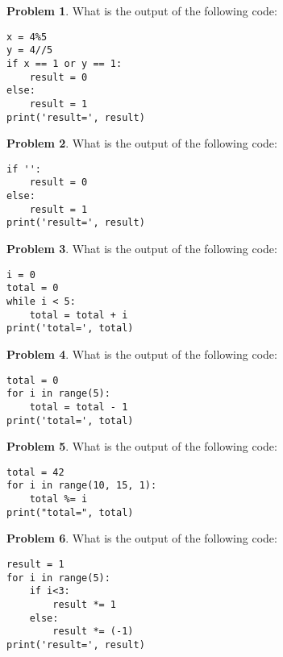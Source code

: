 \documentclass[10pt]{article}
\theoremstyle{definition}
\newtheorem{problem}{Problem}
\begin{document}
\newpage
\begin{problem}
    What is the output of the following code:
\end{problem}
\begin{lstlisting}
x = 4%5
y = 4//5
if x == 1 or y == 1:
    result = 0
else:
    result = 1
print('result=', result)
\end{lstlisting}
\vspace{1.8in}


\begin{problem}
    What is the output of the following code:
\end{problem}
\begin{lstlisting}
if '':
    result = 0
else:
    result = 1
print('result=', result)
\end{lstlisting}
\vspace{1.8in}


\begin{problem}
    What is the output of the following code:
\end{problem}
\begin{lstlisting}
i = 0
total = 0
while i < 5:
    total = total + i
print('total=', total)
\end{lstlisting}
\vspace{1.8in}


\begin{problem}
    What is the output of the following code:
\end{problem}
\begin{lstlisting}
total = 0
for i in range(5):
    total = total - 1
print('total=', total)
\end{lstlisting}
\vspace{2in}


\begin{problem}
    What is the output of the following code:
\end{problem}
\begin{lstlisting}
total = 42
for i in range(10, 15, 1):
    total %= i
print("total=", total)
\end{lstlisting}
\vspace{2in}


\begin{problem}
    What is the output of the following code:
\end{problem}
\begin{lstlisting}
result = 1
for i in range(5):
    if i<3:
        result *= 1
    else:
        result *= (-1)
print('result=', result)
\end{lstlisting}
\vspace{2in}
\end{document}

